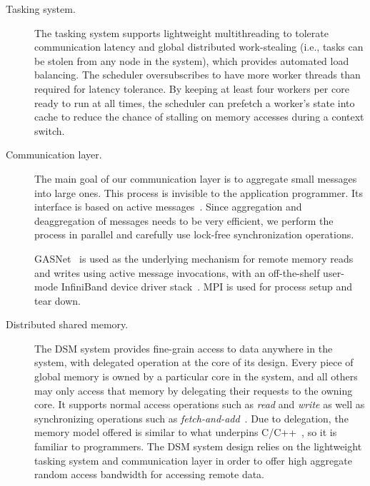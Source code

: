 \begin{description}

\item [Tasking system.] The tasking system supports lightweight multithreading
to tolerate communication latency and global distributed work-stealing (i.e.,
tasks can be stolen from any node in the system), which provides automated
load balancing. The scheduler oversubscribes to have more worker threads than
required for latency tolerance. By keeping at least four workers per 
core ready to run at all times, the scheduler can prefetch a worker's state
into cache to reduce the chance of stalling on memory accesses during a
context switch.

\item[Communication layer.] The main goal of our communication layer is to
aggregate small messages into large ones. This process is invisible to the
application programmer. Its interface is based on active
messages~\cite{vonEicken92}. Since aggregation and deaggregation of messages
needs to be very efficient, we perform the process in parallel and carefully
use lock-free synchronization operations. 

GASNet~\cite{gasnet} is used as the
underlying mechanism for remote memory reads and writes using active message
invocations, with an off-the-shelf user-mode InfiniBand device driver
stack~\cite{OFED}. MPI is used for process setup and tear down.


\item[Distributed shared memory.] The DSM system provides fine-grain access to
data anywhere in the system, with delegated operation at the core of its design.
Every piece of global memory is owned by a particular core in the system, and all others may only access that memory by delegating their requests to the owning core.
It supports normal access operations such as
\emph{read\/} and \emph{write\/} as well as synchronizing operations such as
\emph{fetch-and-add\/}~\cite{fetchandadd}. Due to delegation, the memory model offered is similar to what underpins
C/C++~\cite{N2480,N2800}, so it is familiar to programmers. The DSM system
design relies on the lightweight tasking system and communication layer in
order to offer high aggregate random access bandwidth for accessing remote
data.

\end{description}

